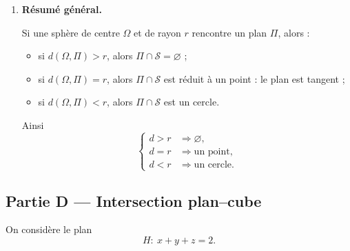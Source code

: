 \documentclass[11pt,a4paper]{article}
\newcommand{\Sphere}{\mathcal{S}}
\begin{document}
\begin{enumerate}[label=\textbf{\arabic*.},resume]
    Donc
    \[
    \boxed{R\cap \Sphere=\varnothing.}
    \]

    \item \textbf{Résumé général.}

    Si une sphère de centre \(\Omega\) et de rayon \(r\) rencontre un plan \(\Pi\), alors :
    \begin{itemize}
        \item si \(d(\Omega,\Pi)>r\), alors \(\Pi\cap \Sphere=\varnothing\) ;
        \item si \(d(\Omega,\Pi)=r\), alors \(\Pi\cap \Sphere\) est réduit à un point : le plan est tangent ;
        \item si \(d(\Omega,\Pi)<r\), alors \(\Pi\cap \Sphere\) est un cercle.
    \end{itemize}

    Ainsi
    \[
    \boxed{
    \begin{cases}
    d>r &\Rightarrow \varnothing,\\
    d=r &\Rightarrow \text{un point},\\
    d<r &\Rightarrow \text{un cercle}.
    \end{cases}}
    \]
\end{enumerate}

\subsection*{Partie D --- Intersection plan--cube}

On considère le plan
\[
H:\ x+y+z=2.
\]
\end{document}
